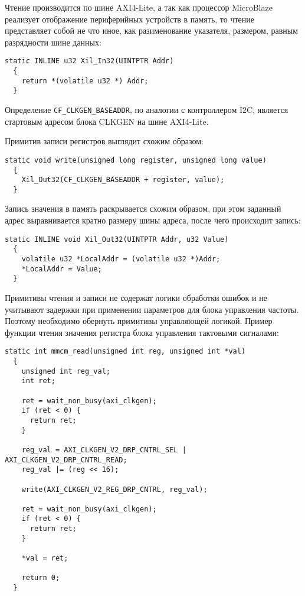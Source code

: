 Чтение производится по шине AXI4-Lite, а так как процессор MicroBlaze реализует
отображение периферийных устройств в память, то чтение представляет собой не что иное,
как разименование указателя, размером, равным разрядности шине данных:
\medskip
\begin{lstlisting}[style=C]
  static INLINE u32 Xil_In32(UINTPTR Addr)
  {
	return *(volatile u32 *) Addr;
  }
\end{lstlisting}
\medskip

Определение \texttt{CF\_CLKGEN\_BASEADDR}, по аналогии с контроллером I2C, является
стартовым адресом блока CLKGEN на шине AXI4-Lite.

Примитив записи регистров выглядит схожим образом:
\medskip
\begin{lstlisting}[style=C]
  static void write(unsigned long register, unsigned long value)
  {
	Xil_Out32(CF_CLKGEN_BASEADDR + register, value);
  }
\end{lstlisting}
\medskip

Запись значения в память раскрывается схожим образом, при этом
заданный адрес выравнивается кратно размеру шины адреса, после
чего происходит запись:
\medskip
\begin{lstlisting}[style=C]
  static INLINE void Xil_Out32(UINTPTR Addr, u32 Value)
  {
	volatile u32 *LocalAddr = (volatile u32 *)Addr;
	*LocalAddr = Value;
  }
\end{lstlisting}
\medskip

Примитивы чтения и записи не содержат логики обработки ошибок и не учитывают
задержки при применении параметров для блока управления частоты. Поэтому
необходимо обернуть примитивы управляющей логикой. Пример функции чтения
значения регистра блока управления тактовыми сигналами:
\medskip
\begin{lstlisting}[style=C]
  static int mmcm_read(unsigned int reg, unsigned int *val)
  {
	unsigned int reg_val;
	int ret;

	ret = wait_non_busy(axi_clkgen);
	if (ret < 0) {
      return ret;
    }

	reg_val = AXI_CLKGEN_V2_DRP_CNTRL_SEL | AXI_CLKGEN_V2_DRP_CNTRL_READ;
	reg_val |= (reg << 16);

	write(AXI_CLKGEN_V2_REG_DRP_CNTRL, reg_val);

	ret = wait_non_busy(axi_clkgen);
	if (ret < 0) {
      return ret;
    }

	*val = ret;

	return 0;
  }
\end{lstlisting}
\medskip

